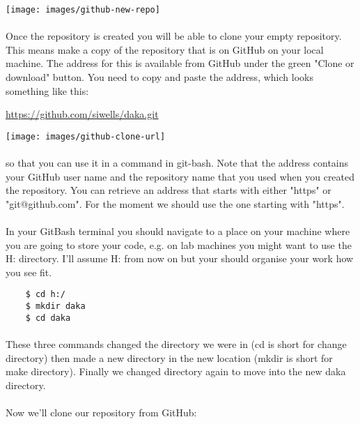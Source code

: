 \documentclass[10pt, a4paper]{article}
\begin{document}
\texttt{[image: images/github-new-repo]}

\paragraph{} Once the repository is created you will be able to clone your empty repository. This means make a copy of the repository that is on GitHub on your local machine. The address for this is available from GitHub under the green "Clone or download" button. You need to copy and paste the address, which looks something like this:

    \url{https://github.com/siwells/daka.git}


\texttt{[image: images/github-clone-url]}

\paragraph{} so that you can use it in a command in git-bash. Note that the address contains your GitHub user name and the repository name that you used when you created the repository. You can retrieve an address that starts with either "https" or "git@github.com". For the moment we should use the one starting with "https".

\paragraph{} In your GitBash terminal you should navigate to a place on your machine where you are going to store your code, e.g. on lab machines you might want to use the H: directory. I'll assume H: from now on but your should organise your work how you see fit.

\begin{lstlisting}
    $ cd h:/
    $ mkdir daka
    $ cd daka
\end{lstlisting}

\paragraph{} These three commands changed the directory we were in (cd is short for change directory) then made a new directory in the new location (mkdir is short for make directory). Finally we changed directory again to move into the new daka directory.

\paragraph{} Now we'll clone our repository from GitHub:
\end{document}
